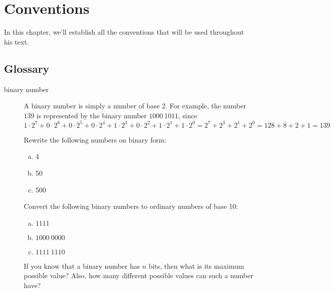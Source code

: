 \begin{comment}
  
\end{comment}

\chapter{Conventions}
\label{cha:pseudocode-convent}

In this chapter, we'll establish all the conventions that will be used
throughout his text.

\section{Glossary}

\begin{description}
\item[binary number] A binary number is simply a number of base 2. For
  example, the number $139$ is represented by the binary number $1000\
  1011$, since $1 \cdot 2^7 + 0 \cdot 2^6 + 0 \cdot 2^5 + 0 \cdot 2^4
  + 1 \cdot 2^3 + 0 \cdot 2^2 + 1 \cdot 2^1 + 1 \cdot 2^0 = 2^7 + 2^3
  + 2^1 + 2^0 = 128 + 8 + 2 + 1 = 139 $

  \begin{Exercise}[label={n-to-bin}]
    Rewrite the following numbers on binary form:

    \begin{enumerate}[(a)]
    \item 4
    \item 50
    \item 500
    \end{enumerate}

  \end{Exercise}

  \begin{Exercise}[label={bin-to-n}]
    Convert the following binary numbers to ordinary numbers of base
    10:

    \begin{enumerate}[(a)]
    \item $1111$
    \item $1000\ 0000$
    \item $1111\ 1110$
    \end{enumerate}

  \end{Exercise}

  \begin{Exercise}[label={n-bits-max-val}]
    If you know that a binary number has $n$ bits, then what is its
    maximum possible value? Also, how many different possible values can
    such a number have?
  \end{Exercise}


\end{description}
